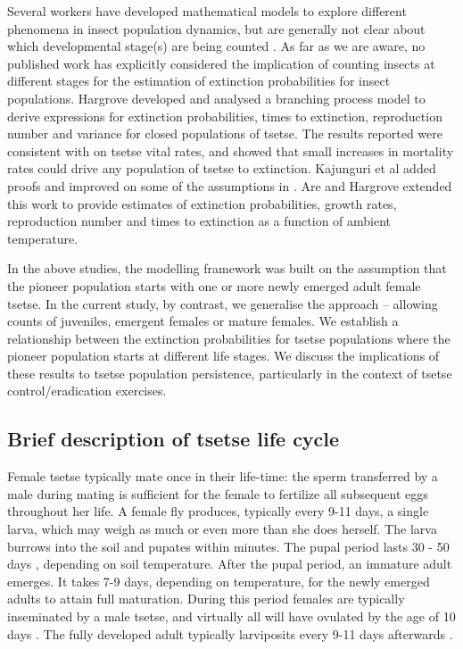 \documentclass[smallextended]{svjour3}
\begin{document}
Several workers have developed mathematical models to explore different phenomena in insect population dynamics, but are generally not clear about which developmental stage(s) are being counted \cite{Ylioja1999,Artzrouni2003,Hargrove2005a,Adams2005,Barclay2011d,Peck2012a,Lin2015,Kajunguri2019}.  As far as we are aware, no published work has explicitly considered the implication of counting insects at different stages for the estimation of extinction probabilities for insect populations. Hargrove \cite{Hargrove2005a} developed and analysed a branching process model to derive expressions for extinction probabilities, times to extinction, reproduction number and variance for closed populations of tsetse. The results reported were consistent with \cite{hargrove1988tsetse} on tsetse vital rates, and showed that small increases in mortality rates could drive any population of tsetse to extinction. Kajunguri et al \cite{Kajunguri2019} added proofs and improved on some of the assumptions in \cite{Hargrove2005a}. Are and Hargrove \cite{Are2019} extended this work to provide estimates of extinction probabilities, growth rates, reproduction number and times to extinction as a function of ambient temperature. 

In the above studies, the modelling framework was built on the assumption that the pioneer population starts with one or more newly emerged adult female tsetse. In the current study, by contrast, we  generalise the approach – allowing counts of juveniles, emergent females or mature females. We establish a relationship between the extinction probabilities for tsetse populations where the pioneer population starts at different life stages. We discuss the implications of these results to tsetse population persistence, particularly in the context of tsetse control/eradication exercises. 

\subsection{Brief description of tsetse life cycle}
Female tsetse typically mate once in their life-time: the sperm transferred by a male during mating is sufficient for the female to fertilize all subsequent eggs throughout her life. A female fly produces, typically every 9-11 days, a single larva, which may weigh as much or even more than she does herself.  The larva burrows into the soil and pupates within minutes. The pupal period lasts 30 - 50 days \cite{PhelpsR.J.&Burrows}, depending on soil temperature. After the pupal period, an immature adult emerges. It takes 7-9 days, depending on temperature, for the newly emerged adults to attain full maturation. During this period females are typically inseminated by a male tsetse, and virtually all will have ovulated by the age of 10 days \cite{Hargrove2012c}. The fully developed adult typically larviposits every 9-11 days afterwards \cite{Hargrove2019}. 
\end{document}
